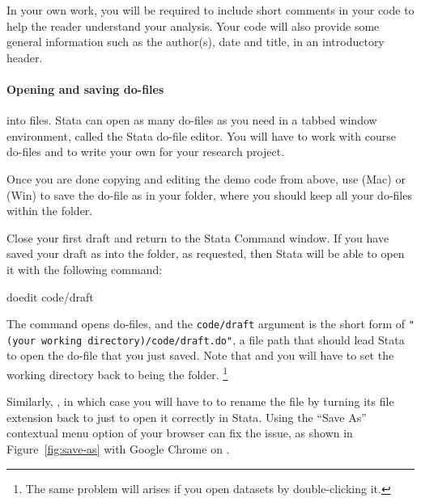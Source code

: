 In your own work, you will be required to include short comments in your code to help the reader understand your analysis. Your code will also provide some general information such as the author(s), date and title, in an introductory header.%

\paragraph{Opening and saving do-files}

 into  files. Stata can open as many do-files as you need in a tabbed window environment, called the Stata do-file editor. You will have to work with course do-files and to write your own for your research project.%

Once you are done copying and editing the demo code from above, use  (Mac) or  (Win) to save the do-file as  in your \code folder, where you should keep all your do-files within the \SRQM folder.%

Close your first draft and return to the Stata Command window. If you have saved your draft as  into the \code folder, as requested, then Stata will be able to open it with the following command:%

\begin{docspec}
  doedit code/draft
\end{docspec}

The  command opens do-files, and the \texttt{code/draft} argument is the short form of \texttt{"(your working directory)/code/draft.do"}, a file path that should lead Stata to open the do-file that you just saved. Note that  and you will have to set the working directory back to being the \SRQM folder.%
  \footnote{The same problem will arises if you open datasets by double-clicking it.}

Similarly, , in which case you will have to to rename the file by turning its file extension back to just  to open it correctly in Stata. Using the ``Save As'' contextual menu option of your browser can fix the issue, as shown in Figure~\ref{fig:save-as} with Google Chrome on \OSX.%

